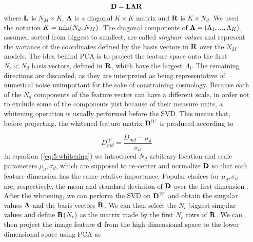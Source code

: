 %
\begin{equation}
\label{eq:5:svd}
\mathbf{D} = \mathbf{L\Lambda R}
\end{equation}
%
where $\mathbf{L}$ is $N_M\times K$, $\mathbf{\Lambda}$ is a diagonal $K\times K$ matrix and $\mathbf{R}$ is $K\times N_d$. We used the notation $K={\rm min}(N_d,N_M)$. The diagonal components of $\mathbf{\Lambda}=(\Lambda_1,...,\Lambda_K)$, assumed sorted from biggest to smallest, are called \textit{singluar values} and represent the variance of the coordinates defined by the basis vectors in $\mathbf{R}$ over the $N_M$ models. The idea behind PCA is to project the feature space onto the first $N_c<N_d$ basis vectors, defined in $\mathbf{R}$, which have the largest $\Lambda_i$. The remaining directions are discarded, as they are interpreted as being representative of numerical noise unimportant for the sake of constraining cosmology. Because each of the $N_d$ components of the feature vector can have a different scale, in order not to exclude some of the components just because of their measure units, a whitening operation is usually performed before the SVD. This means that, before projecting, the whitened feature matrix $\mathbf{D}^W$ is produced according to

\begin{equation}
\label{eq:5:whitening}
D^W_{md} = \frac{D_{md}-\mu_d}{\sigma_d}
\end{equation}
%
In equation (\ref{eq:5:whitening}) we introduced $N_d$ arbitrary location and scale parameters $\mu_d,\sigma_d$, which are supposed to re--center and normalize $\mathbf{D}$ so that each feature dimension has the same relative importance. Popular choices for $\mu_d,\sigma_d$ are, respectively, the mean and standard deviation of $\mathbf{D}$ over the first dimension \citep{astroMLText}. After the whitening, we can perform the SVD on $\mathbf{D}^W$ and obtain the singular values $\mathbf{\Lambda}$ and the basis vectors $\mathbf{R}$. We can then select the $N_c$ biggest singular values and define $\mathbf{R}(N_c)$ as the matrix made by the first $N_c$ rows of $\mathbf{R}$. We can then project the image feature $\mathbf{d}$ from the high dimensional space to the lower dimensional space using PCA as 

